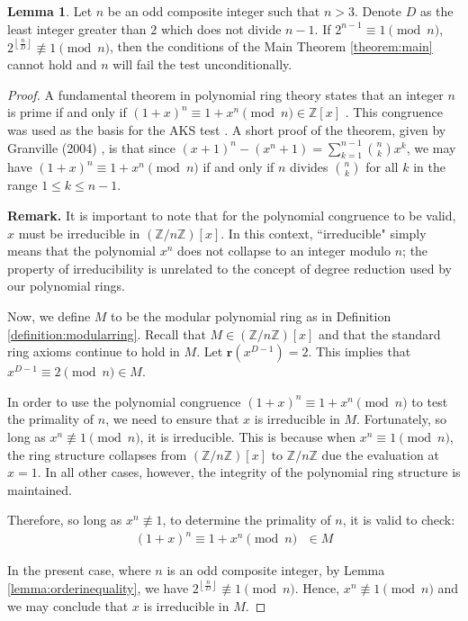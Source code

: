 \documentclass{article}
\theoremstyle{plain}
\theoremstyle{definition}
\newtheorem{lemma}{Lemma}
\newcommand{\floor}[1]{\left\lfloor #1 \right\rfloor}
\newcommand{\redu}{\textbf{r}}
\newcommand{\Z}{\mathbb{Z}}
\newcommand{\Zn}{\Z/n\Z}
\newcommand{\Mx}{M}
\begin{document}
\begin{lemma} \label{lemma:composites}
Let $n$ be an odd composite integer such that $n > 3$. Denote $D$ as the least integer greater than $2$ which does not divide $n-1$. If $2^{n-1} \equiv 1 \pmod{n}$, $2^{\floor{\frac{n}{D}}} \not\equiv 1 \pmod{n}$, then the conditions of the Main Theorem \ref{theorem:main} cannot hold and $n$ will fail the test unconditionally.
\end{lemma}
\begin{proof}
A fundamental theorem in polynomial ring theory states that an integer $n$ is prime if and only if $(1 + x)^n \equiv 1 + x^n \pmod{n} \in \Z[x]$ \cite{granville2004primes}. This congruence was used as the basis for the AKS test \cite{aks2002}. A short proof of the theorem, given by Granville (2004) \cite{granville2004primes}, is that since $(x + 1)^n - (x^n + 1) = \sum_{k=1}^{n-1} \binom{n}{k} x^k$, we may have $(1 + x)^n \equiv 1 + x^n \pmod{n}$ if and only if $n$ divides $\binom{n}{k}$ for all $k$ in the range $1 \leq k \leq n-1$.

\textbf{Remark.} It is important to note that for the polynomial congruence to be valid, $x$ must be irreducible in $(\Zn)[x]$. In this context, ``irreducible" simply means that the polynomial $x^n$ does not collapse to an integer modulo $n$; the property of irreducibility is unrelated to the concept of degree reduction used by our polynomial rings.

Now, we define $\Mx$ to be the modular polynomial ring as in Definition \ref{definition:modularring}. Recall that $M \in (\Zn)[x]$ and that the standard ring axioms continue to hold in $\Mx$. Let $\redu(x^{D-1}) = 2$. This implies that $x^{D-1} \equiv 2 \pmod{n} \in \Mx$.

In order to use the polynomial congruence $(1 + x)^n \equiv 1 + x^n \pmod{n}$ to test the primality of $n$, we need to ensure that $x$ is irreducible in $\Mx$. Fortunately, so long as $x^n \not\equiv 1 \pmod{n}$, it is irreducible. This is because when $x^n \equiv 1 \pmod{n}$, the ring structure collapses from $(\Zn)[x]$ to $\Zn$ due the evaluation at $x=1$. In all other cases, however, the integrity of the polynomial ring structure is maintained.

Therefore, so long as $x^n \not\equiv 1$, to determine the primality of $n$, it is valid to check:
\begin{align}
    (1 + x)^n \equiv 1 + x^n \pmod{n} \text{ } \in M
\end{align}

In the present case, where $n$ is an odd composite integer, by Lemma \ref{lemma:orderinequality}, we have $2^{\floor{\frac{n}{D}}} \not\equiv 1 \pmod{n}$. Hence, $x^n \not\equiv 1 \pmod{n}$ and we may conclude that $x$ is irreducible in $M$.


\end{proof}
\end{document}
